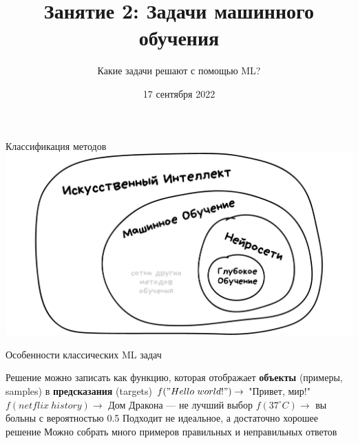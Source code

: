 \documentclass[aspectratio=169, professionalfonts]{beamer}
\title{Занятие 2: Задачи машинного обучения}
\subtitle{Какие задачи решают с помощью ML?}
\date{17 сентября 2022}
\begin{document}
\maketitle

\begin{frame}{Классификация методов}
    \centering
    \includegraphics[width=.9\linewidth]{graphs/fig0.jpg}
\end{frame}

\begin{frame}{Особенности классических ML задач}
    \begin{outline}
        \1 Решение можно записать как функцию, которая отображает \textbf{объекты}
        (примеры, samples) в \textbf{предсказания} (targets)
            \2 \( f("Hello \ world!") \to \) "Привет, мир!"
            \2 \( f(netflix \ history) \to \) Дом Дракона --- не лучший выбор
            \2 \( f(37^\circ C) \to \) вы больны с вероятностью 0.5
        \1 Подходит не идеальное, а достаточно хорошее решение
        \1 Можно собрать много примеров правильных и неправильных ответов
    \end{outline}
\end{frame}
\end{document}
